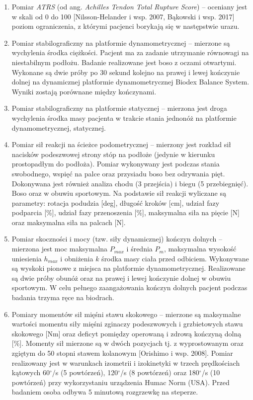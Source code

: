 \begin{enumerate}
	\item Pomiar \textit{ATRS} (od ang. \textit{Achilles Tendon Total Rupture Score}) -- oceniany jest w skali od 0 do 100 [Nilsson-Helander i wsp. 2007, Bąkowski i wsp. 2017] poziom ograniczenia, z którymi pacjenci borykają się w następstwie urazu.
	\item Pomiar stabilograficzny na platformie dynamometrycznej -- mierzone są wychylenia środka ciężkości. Pacjent ma za zadanie utrzymanie równowagi na niestabilnym podłożu. Badanie realizowane jest boso z oczami otwartymi. Wykonane są dwie próby po 30 sekund kolejno na prawej i lewej kończynie dolnej na dynamicznej platformie dynamometrycznej Biodex Balance System. Wyniki zostają porównane między kończynami. 
	\item Pomiar stabilograficzny na platformie statycznej -- mierzona jest droga wychylenia środka masy pacjenta w trakcie stania jednonóż na platformie dynamometrycznej, statycznej.
	\item Pomiar sił reakcji na ścieżce podometrycznej -- mierzony jest rozkład sił nacisków podeszwowej strony stóp na podłoże (jedynie w kierunku prostopadłym do podłoża). Pomiar wykonywany jest podczas stania swobodnego, wspięć na palce oraz przysiadu boso bez odrywania pięt. Dokonywana jest również analiza chodu (3 przejścia) i biegu (5 przebiegnięć). Boso oraz w obuwiu sportowym. Na podstawie sił reakcji wyliczane są parametry: rotacja podudzia [deg], długość kroków [cm], udział fazy podparcia [\%], udział fazy przenoszenia [\%], maksymalna siła na pięcie [N] oraz maksymalna siła na palcach [N].
	\item Pomiar skoczności i mocy (tzw. siły dynamicznej) kończyn dolnych -- mierzona jest moc maksymalna $P_{max}$ i średnia $P_m$, maksymalna wysokość uniesienia $h_{max}$ i obniżenia $k$ środka masy ciała przed odbiciem. Wykonywane są wyskoki pionowe z miejsca na platformie dynamometrycznej. Realizowane są dwie próby obunóż oraz na prawej i lewej kończynie dolnej w obuwiu sportowym. W celu pełnego zaangażowania kończyn dolnych pacjent podczas badania trzyma ręce na biodrach. 
	\item Pomiary momentów sił mięśni stawu skokowego -- mierzone są maksymalne wartości momentu siły mięśni zginaczy podeszwowych i grzbietowych stawu skokowego [Nm] oraz deficyt pomiędzy operowaną i zdrową kończyną dolną [\%]. Momenty sił mierzone są w dwóch pozycjach tj. z wyprostowanym oraz zgiętym do 50 stopni stawem kolanowym [Orishimo i wsp. 2008]. Pomiar realizowany jest w warunkach izometrii i izokinetyki w trzech prędkościach kątowych 60$^\circ$/s (5 powtórzeń), 120$^\circ$/s (8 powtórzeń) oraz 180$^\circ$/s (10 powtórzeń) przy wykorzystaniu urządzenia Humac Norm (USA). Przed badaniem osoba odbywa 5 minutową rozgrzewkę na steperze.
\end{enumerate}

